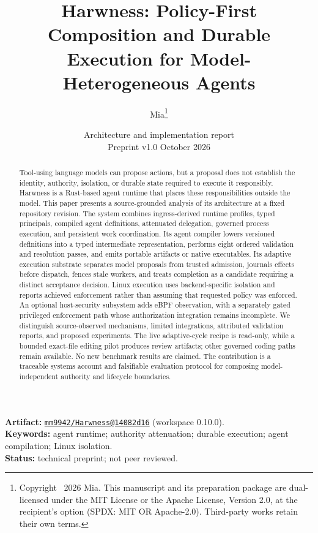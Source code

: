 \documentclass[11pt,a4paper]{article}
\title{\vspace{-1.5em}\LARGE\bfseries Harwness: Policy-First Composition and Durable Execution for Model-Heterogeneous Agents}
\author{Mia\thanks{Copyright \textcopyright\ 2026 Mia. This manuscript and its preparation package are dual-licensed under the MIT License or the Apache License, Version 2.0, at the recipient's option (SPDX: MIT OR Apache-2.0). Third-party works retain their own terms.}}
\date{\normalsize Architecture and implementation report\\Preprint v1.0 \quad 30 October 2026}
\newcommand{\artifactshort}{14082d16}
\newcommand{\artifactversion}{0.10.0}
\begin{document}
\maketitle
\thispagestyle{plain}
\begin{abstract}
Tool-using language models can propose actions, but a proposal does not establish the identity, authority, isolation, or durable state required to execute it responsibly. Harwness is a Rust-based agent runtime that places these responsibilities outside the model. This paper presents a source-grounded analysis of its architecture at a fixed repository revision. The system combines ingress-derived runtime profiles, typed principals, compiled agent definitions, attenuated delegation, governed process execution, and persistent work coordination. Its agent compiler lowers versioned definitions into a typed intermediate representation, performs eight ordered validation and resolution passes, and emits portable artifacts or native executables. Its adaptive execution substrate separates model proposals from trusted admission, journals effects before dispatch, fences stale workers, and treats completion as a candidate requiring a distinct acceptance decision. Linux execution uses backend-specific isolation and reports achieved enforcement rather than assuming that requested policy was enforced. An optional host-security subsystem adds eBPF observation, with a separately gated privileged enforcement path whose authorization integration remains incomplete. We distinguish source-observed mechanisms, limited integrations, attributed validation reports, and proposed experiments. The live adaptive-cycle recipe is read-only, while a bounded exact-file editing pilot produces review artifacts; other governed coding paths remain available. No new benchmark results are claimed. The contribution is a traceable systems account and falsifiable evaluation protocol for composing model-independent authority and lifecycle boundaries.
\end{abstract}
\noindent\textbf{Artifact:} \href{https://github.com/mm9942/Harwness/commit/14082d16b5e21f920acd2dc0b84ebd42f32ac859}{\texttt{mm9942/Harwness@\artifactshort}} (workspace \artifactversion).\\
\textbf{Keywords:} agent runtime; authority attenuation; durable execution; agent compilation; Linux isolation.\\
\textbf{Status:} technical preprint; not peer reviewed.





\end{document}
